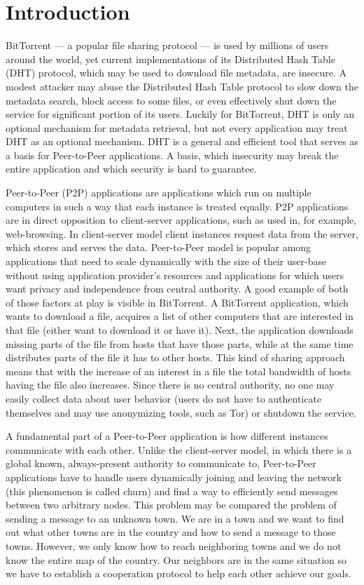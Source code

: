 \chapter{Introduction}

BitTorrent --- a popular file sharing protocol --- is used by millions of users
around the world, yet current implementations of its Distributed Hash Table
(DHT) protocol, which may be used to download file metadata, are insecure.
A modest attacker may abuse the Distributed Hash Table protocol to slow down the
metadata search, block access to some files, or even effectively shut down the
service for significant portion of its users.
Luckily for BitTorrent, DHT is only an optional mechanism for metadata
retrieval, but not every application may treat DHT as an optional mechanism.
DHT is a general and efficient tool that serves as a basis for Peer-to-Peer
applications.
A basis, which insecurity may break the entire application and which security is
hard to guarantee.

Peer-to-Peer (P2P) applications are applications which run on multiple computers in
such a way that each instance is treated equally.
P2P applications are in direct opposition to client-server applications, such as
used in, for example, web-browsing.
In client-server model client instances request data from the server, which
stores and serves the data.
Peer-to-Peer model is popular among applications that need to scale dynamically
with the size of their user-base without using application provider's resources
and applications for which users want privacy and independence from central
authority.
A good example of both of those factors at play is visible in BitTorrent.
A BitTorrent application, which wants to download a file, acquires a list of
other computers that are interested in that file (either want to download it or
have it).
Next, the application downloads missing parts of the file from hosts that have
those parts, while at the same time distributes parts of the file it has to
other hosts.
This kind of sharing approach means that with the increase of an interest in a
file the total bandwidth of hosts having the file also increases.
Since there is no central authority, no one may easily collect data about user
behavior (users do not have to authenticate themselves and may use anonymizing
tools, such as Tor) or shutdown the service.

A fundamental part of a Peer-to-Peer application is how different instances
communicate with each other.
Unlike the client-server model, in which there is a global known, always-present
authority to communicate to, Peer-to-Peer applications have to handle users
dynamically joining and leaving the network (this phenomenon is called churn)
and find a way to efficiently send messages between two arbitrary nodes.
This problem may be compared the problem of sending a message to an unknown
town.
We are in a town and we want to find out what other towns are in the country and
how to send a message to those towns.
However, we only know how to reach neighboring towns and we do not know the
entire map of the country.
Our neighbors are in the same situation so we have to establish a cooperation
protocol to help each other achieve our goals.

